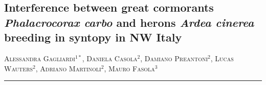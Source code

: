 \begin{otherlanguage}{english}
\setcounter{figure}{0}
\setcounter{table}{0}

\begin{adjustwidth}{-3.5cm}{0cm}
\pagestyle{CIOpage}
\chapter*[Breeding interactions between great cormorants and grey
herons]{Interference between great cormorants \textbf{\textit{Phalacrocorax carbo}}\textbf{ and}\textbf{ herons
}\textbf{\textit{Ardea cinerea}}\textbf{ breeding in syntopy
}\textbf{in NW Italy}}

\textsc{Alessandra Gagliardi}$^{1*}$, \textsc{Daniela Casola}$^{2}$, 
\textsc{Damiano Preantoni}$^{2}$, \textsc{Lucas Wauters}$^{2}$, 
\textsc{Adriano Martinoli}$^{2}$, \textsc{Mauro Fasola}$^{3}$\\

     
\noindent\color{MUSEBLUE}\rule{27cm}{2pt}
\vspace{1cm}
\end{adjustwidth}




\end{otherlanguage}
